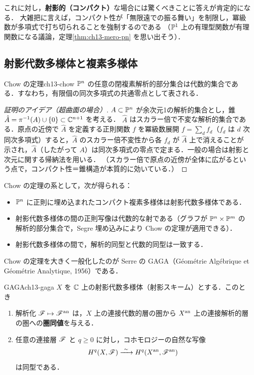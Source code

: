 これに対し，\textbf{射影的（コンパクト）}な場合には驚くべきことに答えが肯定的になる．
大雑把に言えば，コンパクト性が「無限遠での振る舞い」を制限し，冪級数が多項式で打ち切られることを強制するのである
（$\mathbb{P}^1$ 上の有理型関数が有理関数になる議論，定理\ref{thm:ch13-mero-pn} を思い出そう）．

\subsection{射影代数多様体と複素多様体}

\begin{mythm}{Chow の定理}{ch13-chow}
$\mathbb{P}^n$ の任意の閉複素解析的部分集合は代数的集合である．すなわち，有限個の同次多項式の共通零点として表される．
\end{mythm}

\begin{proof}[証明のアイデア（超曲面の場合）]
$A\subset\mathbb{P}^n$ が余次元1の解析的集合とし，錐 $\hat A=\pi^{-1}(A)\cup\{0\}\subset\mathbb{C}^{n+1}$ を考える．
$\hat A$ はスカラー倍で不変な解析的集合である．原点の近傍で $\hat A$ を定義する正則関数 $f$ を冪級数展開
$f=\sum_d f_d$（$f_d$ は $d$ 次同次多項式）すると，$\hat A$ のスカラー倍不変性から各 $f_d$ が $\hat A$ 上で消えることが
示され，$\hat A$（したがって $A$）は同次多項式の零点で定まる．一般の場合は射影と次元に関する帰納法を用いる．
（スカラー倍で原点の近傍が全体に広がるという点で，コンパクト性＝錐構造が本質的に効いている．）
\end{proof}

Chow の定理の系として，次が得られる：
\begin{itemize}
  \item $\mathbb{P}^n$ に正則に埋め込まれたコンパクト複素多様体は射影代数多様体である．
  \item 射影代数多様体の間の正則写像は代数的な射である（グラフが $\mathbb{P}^n\times\mathbb{P}^m$ の解析的部分集合で，Segre 埋め込みにより Chow の定理が適用できる）．
  \item 射影代数多様体の間で，解析的同型と代数的同型は一致する．
\end{itemize}

Chow の定理を大きく一般化したのが Serre の GAGA（Géométrie Algébrique et Géométrie Analytique, 1956）である．

\begin{mythm}{GAGA}{ch13-gaga}
$X$ を $\mathbb{C}$ 上の射影代数多様体（射影スキーム）とする．このとき
\begin{enumerate}
  \item 解析化 $\mathscr{F}\mapsto\mathscr{F}^{\rm an}$ は，$X$ 上の連接代数的層の圏から $X^{\rm an}$ 上の連接解析的層の圏への\textbf{圏同値}を与える．
  \item 任意の連接層 $\mathscr{F}$ と $q\geq0$ に対し，コホモロジーの自然な写像
  \begin{equation}
    H^q(X,\mathscr{F})\xrightarrow{\ \sim\ } H^q(X^{\rm an},\mathscr{F}^{\rm an})
  \end{equation}
  は同型である．
\end{enumerate}
\end{mythm}

